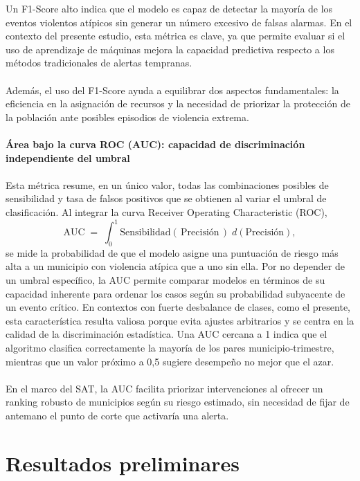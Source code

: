 Un F1-Score alto indica que el modelo es capaz de detectar la mayoría de los eventos violentos atípicos sin generar un número excesivo de falsas alarmas. En el contexto del presente estudio, esta métrica es clave, ya que permite evaluar si el uso de aprendizaje de máquinas mejora la capacidad predictiva respecto a los métodos tradicionales de alertas tempranas.
\\\\
Además, el uso del F1-Score ayuda a equilibrar dos aspectos fundamentales: la eficiencia en la asignación de recursos y la necesidad de priorizar la protección de la población ante posibles episodios de violencia extrema.
\\\\
\textbf{Área bajo la curva ROC (AUC): capacidad de discriminación independiente del umbral}
\\\\
Esta métrica resume, en un único valor, todas las combinaciones posibles de sensibilidad y tasa de falsos positivos que se obtienen al variar el umbral de clasificación. Al integrar la curva Receiver Operating Characteristic (ROC),
\[
\text{AUC} \;=\; \int_{0}^{1} \!\text{Sensibilidad}(\,\text{Precisión}\,)\;d(\text{Precisión}),
\]
se mide la probabilidad de que el modelo asigne una puntuación de riesgo más alta a un municipio con violencia atípica que a uno sin ella. Por no depender de un umbral específico, la AUC permite comparar modelos en términos de su capacidad inherente para ordenar los casos según su probabilidad subyacente de un evento crítico. En contextos con fuerte desbalance de clases, como el presente, esta característica resulta valiosa porque evita ajustes arbitrarios y se centra en la calidad de la discriminación estadística. Una AUC cercana a 1 indica que el algoritmo clasifica correctamente la mayoría de los pares municipio‐trimestre, mientras que un valor próximo a 0,5 sugiere desempeño no mejor que el azar.
\\\\
En el marco del SAT, la AUC facilita priorizar intervenciones al ofrecer un ranking robusto de municipios según su riesgo estimado, sin necesidad de fijar de antemano el punto de corte que activaría una alerta.

\section{Resultados preliminares}

